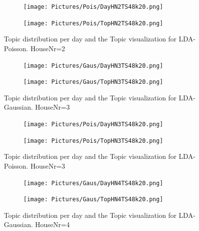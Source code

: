 \documentclass[11pt,a4paper]{article}
\begin{document}
\begin{figure}
 \centering
 \begin{subfigure}[b]{0.45\linewidth}
  \centering
  \texttt{[image: Pictures/Pois/DayHN2TS48k20.png]}
 \end{subfigure}
 \begin{subfigure}[b]{0.45\linewidth}
  \centering
  \texttt{[image: Pictures/Pois/TopHN2TS48k20.png]}
 \end{subfigure}
 \caption{Topic distribution per day and the Topic visualization for LDA-Poisson. HouseNr=2}
\end{figure}


\begin{figure}
 \centering
 \begin{subfigure}[b]{0.45\linewidth}
  \centering
  \texttt{[image: Pictures/Gaus/DayHN3TS48k20.png]}
 \end{subfigure}
 \begin{subfigure}[b]{0.45\linewidth}
  \centering
  \texttt{[image: Pictures/Gaus/TopHN3TS48k20.png]}
 \end{subfigure}
 \caption{Topic distribution per day and the Topic visualization for LDA-Gaussian. HouseNr=3}
\end{figure}

\begin{figure}
 \centering
 \begin{subfigure}[b]{0.45\linewidth}
  \centering
  \texttt{[image: Pictures/Pois/DayHN3TS48k20.png]}
 \end{subfigure}
 \begin{subfigure}[b]{0.45\linewidth}
  \centering
  \texttt{[image: Pictures/Pois/TopHN3TS48k20.png]}
 \end{subfigure}
 \caption{Topic distribution per day and the Topic visualization for LDA-Poisson. HouseNr=3}
\end{figure}

\begin{figure}
 \centering
 \begin{subfigure}[b]{0.45\linewidth}
  \centering
  \texttt{[image: Pictures/Gaus/DayHN4TS48k20.png]}
 \end{subfigure}
 \begin{subfigure}[b]{0.45\linewidth}
  \centering
  \texttt{[image: Pictures/Gaus/TopHN4TS48k20.png]}
 \end{subfigure}
 \caption{Topic distribution per day and the Topic visualization for LDA-Gaussian. HouseNr=4}
\end{figure}
\end{document}
